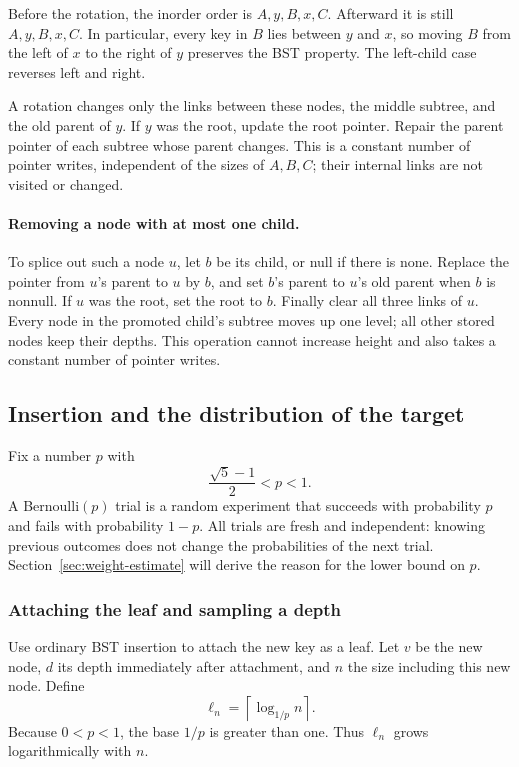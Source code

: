 \documentclass[11pt,a4paper]{article}
\theoremstyle{readable}
\newcommand{\ceil}[1]{\left\lceil #1\right\rceil}
\begin{document}
Before the rotation, the inorder order is $A,y,B,x,C$. Afterward it is
still $A,y,B,x,C$. In particular, every key in $B$ lies between $y$
and $x$, so moving $B$ from the left of $x$ to the right of $y$ preserves
the BST property. The left-child case reverses left and right.

A rotation changes only the links between these nodes, the middle
subtree, and the old parent of $y$. If $y$ was the root, update the root
pointer. Repair the parent pointer of each subtree whose parent changes.
This is a constant number of pointer writes, independent of the sizes
of $A,B,C$; their internal links are not visited or changed.

\paragraph{Removing a node with at most one child.}
To splice out such a node $u$, let $b$ be its child, or null if there
is none. Replace the pointer from $u$'s parent to $u$ by $b$, and set
$b$'s parent to $u$'s old parent when $b$ is nonnull. If $u$ was the
root, set the root to $b$. Finally clear all three links of $u$.
Every node in the promoted child's subtree moves up one level; all
other stored nodes keep their depths. This operation cannot increase
height and also takes a constant number of pointer writes.

\FloatBarrier
\subsection{Insertion and the distribution of the target}
\label{sec:insertion}

Fix a number $p$ with
\[
  \frac{\sqrt5-1}{2}<p<1.
\]
A Bernoulli$(p)$ trial is a random experiment that succeeds with
probability $p$ and fails with probability $1-p$. All trials are fresh
and independent: knowing previous outcomes does not change the
probabilities of the next trial. Section~\ref{sec:weight-estimate}
will derive the reason for the lower bound on $p$.

\subsubsection*{Attaching the leaf and sampling a depth}
Use ordinary BST insertion to attach the new key as a leaf. Let $v$
be the new node, $d$ its depth immediately after attachment, and $n$
the size including this new node. Define
\[
  \ell_n=\ceil{\log_{1/p}n}.
\]
Because $0<p<1$, the base $1/p$ is greater than one. Thus $\ell_n$
grows logarithmically with $n$.
\end{document}
